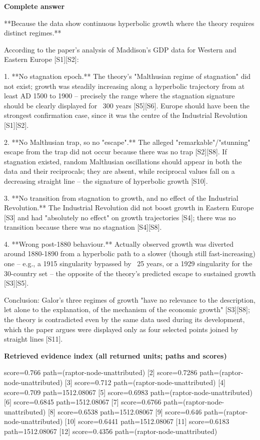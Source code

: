 \documentclass[10pt]{article}
\begin{document}
\textbf{Complete answer}
\begin{AnswerText}
**Because the data show continuous hyperbolic growth where the theory requires distinct regimes.**

According to the paper's analysis of Maddison's GDP data for Western and Eastern Europe [S1][S2]:

1. **No stagnation epoch.** The theory's "Malthusian regime of stagnation" did not exist; growth was steadily increasing along a hyperbolic trajectory from at least AD 1500 to 1900 -- precisely the range where the stagnation signature should be clearly displayed for ~300 years [S5][S6]. Europe should have been the strongest confirmation case, since it was the centre of the Industrial Revolution [S1][S2].

2. **No Malthusian trap, so no "escape".** The alleged "remarkable"/"stunning" escape from the trap did not occur because there was no trap [S2][S8]. If stagnation existed, random Malthusian oscillations should appear in both the data and their reciprocals; they are absent, while reciprocal values fall on a decreasing straight line -- the signature of hyperbolic growth [S10].

3. **No transition from stagnation to growth, and no effect of the Industrial Revolution.** The Industrial Revolution did not boost growth in Eastern Europe [S3] and had "absolutely no effect" on growth trajectories [S4]; there was no transition because there was no stagnation [S4][S8].

4. **Wrong post-1880 behaviour.** Actually observed growth was diverted around 1880-1890 from a hyperbolic path to a slower (though still fast-increasing) one -- e.g., a 1915 singularity bypassed by ~25 years, or a 1929 singularity for the 30-country set -- the opposite of the theory's predicted escape to sustained growth [S3][S5].

Conclusion: Galor's three regimes of growth "have no relevance to the description, let alone to the explanation, of the mechanism of the economic growth" [S3][S8]; the theory is contradicted even by the same data used during its development, which the paper argues were displayed only as four selected points joined by straight lines [S11].
\end{AnswerText}

\textbf{Retrieved evidence index (all returned units; paths and scores) }
\begin{EvidenceText}
[1] score=0.766 path=(raptor-node-unattributed)
[2] score=0.7286 path=(raptor-node-unattributed)
[3] score=0.712 path=(raptor-node-unattributed)
[4] score=0.709 path=1512.08067
[5] score=0.6983 path=(raptor-node-unattributed)
[6] score=0.6845 path=1512.08067
[7] score=0.6766 path=(raptor-node-unattributed)
[8] score=0.6538 path=1512.08067
[9] score=0.646 path=(raptor-node-unattributed)
[10] score=0.6441 path=1512.08067
[11] score=0.6183 path=1512.08067
[12] score=0.4356 path=(raptor-node-unattributed)
\end{EvidenceText}
\end{document}
